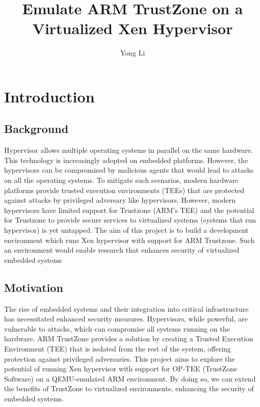 \documentclass[acmtog]{acmart}
\begin{document}
\title{Emulate ARM TrustZone on a Virtualized Xen Hypervisor}


\author{Yong Li}

\renewcommand{\shortauthors}{Yong Li}


\begin{abstract}
\end{abstract}

\maketitle

\section{Introduction}




\subsection{Background}
Hypervisor allows multiple operating systems in parallel on the same hardware. This
technology is increasingly adopted on embedded platforms. However, the hypervisors can be
compromised by malicious agents that would lead to attacks on all the operating systems. To mitigate
such scenarios, modern hardware platforms provide trusted execution environments (TEEs) that are
protected against attacks by privileged adversary like hypervisors. However, modern hypervisors have
limited support for Trustzone (ARM’s TEE) and the potential for Trustzone to provide secure services to
virtualized systems (systems that run hypervisor) is yet untapped. The aim of this project is to build a
development environment which runs Xen hypervisor with support for ARM Trustzone. Such an
environment would enable research that enhances security of virtualized embedded systems

\subsection{Motivation}
The rise of embedded systems and their integration into critical infrastructure has necessitated enhanced security measures. Hypervisors, while powerful, are vulnerable to attacks, which can compromise all systems running on the hardware. ARM TrustZone provides a solution by creating a Trusted Execution Environment (TEE) that is isolated from the rest of the system, offering protection against privileged adversaries. This project aims to explore the potential of running Xen hypervisor with support for OP-TEE (TrustZone Software) on a QEMU-emulated ARM environment. By doing so, we can extend the benefits of TrustZone to virtualized environments, enhancing the security of embedded systems.
\end{document}
